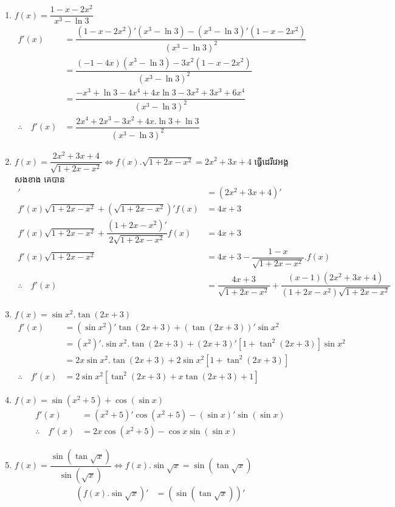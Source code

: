 \documentclass[a4paper,12pt]{article}
\begin{document}
\begin{enumerate}
\item $f(x)=\dfrac{1-x-2x^2}{x^3-\ln 3}$
\begin{align*}
f'(x)&=\dfrac{(1-x-2x^2)'(x^3-\ln 3)-(x^3-\ln 3)'(1-x-2x^2)}{(x^3-\ln 3)^2}\\
&=\dfrac{(-1-4x)(x^3-\ln 3)-3x^2(1-x-2x^2)}{(x^3-\ln 3)^2}\\
&=\dfrac{-x^3+\ln 3-4x^4+4x\ln 3 -3x^2+3x^3+6x^4}{(x^3-\ln 3)^2}\\
\therefore \quad f'(x)&=\dfrac{2x^4+2x^3-3x^2+4x.\ln 3+\ln 3}{(x^3-\ln 3)^2}
\end{align*}
\item $f(x)=\dfrac{2x^2+3x+4}{\sqrt{1+2x-x^2}} \Longleftrightarrow f(x).\sqrt{1+2x-x^2}=2x^2+3x+4$ ធ្វើដេរីវេអង្គសងខាង គេបាន 
\begin{align*}
[f(x)\sqrt{1+2x-x^2}]'&=(2x^2+3x+4)'\\
f'(x)\sqrt{1+2x-x^2}+(\sqrt{1+2x-x^2})'f(x)&=4x+3\\
f'(x)\sqrt{1+2x-x^2}+\dfrac{(1+2x-x^2)'}{2\sqrt{1+2x-x^2}}f(x)&=4x+3\\
f'(x)\sqrt{1+2x-x^2}&=4x+3-\dfrac{1-x}{\sqrt{1+2x-x^2}}.f(x)\\
\therefore \quad f'(x)&=\dfrac{4x+3}{\sqrt{1+2x-x^2}}+\dfrac{(x-1)(2x^2+3x+4)}{(1+2x-x^2)\sqrt{1+2x-x^2}}
\end{align*}
\item $f(x)=\sin x^2.\tan (2x+3)$
\begin{align*}
f'(x)&= (\sin x^2)'\tan (2x+3)+(\tan (2x+3))'\sin x^2\\
&=(x^2)'.\sin x^2. \tan (2x+3)+(2x+3)'[1+\tan^2 (2x+3)]\sin x^2\\
&=2x\sin x^2 .\tan (2x+3)+2\sin x^2 [1+\tan^2 (2x+3)]\\
\therefore \quad f'(x)&=2\sin x^2 [\tan^2 (2x+3)+x\tan (2x+3)+1]
\end{align*}
\item $f(x)=\sin (x^2+5)+\cos (\sin x)$
\begin{align*}
f'(x)&=(x^2+5)'\cos (x^2+5)-(\sin x)'\sin (\sin x)\\
\therefore \quad f'(x)&=2x\cos (x^2+5)-\cos x\sin (\sin x)
\end{align*}
\item $f(x)=\dfrac{\sin (\tan \sqrt{x})}{\sin (\sqrt{x})}\Longleftrightarrow f(x).\sin \sqrt{x}=\sin (\tan \sqrt{x})$
\begin{align*}
\left(f(x).\sin \sqrt{x}\right)'&=\left(\sin (\tan \sqrt{x})\right)'\\

\end{align*}
\end{enumerate}
\end{document}
